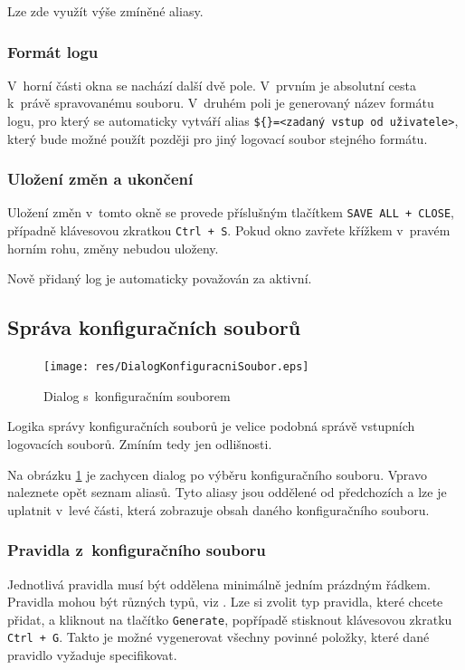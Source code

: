 \documentclass[a4paper,12pt]{article}
\begin{document}
Lze zde využít výše zmíněné aliasy.

\subsubsection{Formát logu}
V~horní části okna se nachází další dvě pole. V~prvním je absolutní cesta k~právě spravovanému souboru. V~druhém poli je generovaný název formátu logu, pro který se automaticky vytváří alias \texttt{\$\{<název formátu>\}=<zadaný vstup od uživatele>}, který bude možné použít později pro jiný logovací soubor stejného formátu.

\subsubsection{Uložení změn a ukončení}
Uložení změn v~tomto okně se provede příslušným tlačítkem \texttt{SAVE ALL + CLOSE}, případně klávesovou zkratkou \texttt{Ctrl + S}. Pokud okno zavřete křížkem v~pravém horním rohu, změny nebudou uloženy.

Nově přidaný log je automaticky považován za aktivní.

\subsection{Správa konfiguračních souborů}
\begin{figure}[h]
  \centering
  \texttt{[image: res/DialogKonfiguracniSoubor.eps]}
  \caption{Dialog s~konfiguračním souborem}
  \label{fig:DialogKonfiguracniSoubor}
\end{figure}

Logika správy konfiguračních souborů je velice podobná správě vstupních logovacích souborů. Zmíním tedy jen odlišnosti.

Na obrázku \ref{fig:DialogKonfiguracniSoubor} je zachycen dialog po výběru konfiguračního souboru.
Vpravo naleznete opět seznam aliasů. Tyto aliasy jsou oddělené od předchozích a lze je uplatnit v~levé části, která zobrazuje obsah daného konfiguračního souboru.

\subsubsection{Pravidla z~konfiguračního souboru}
Jednotlivá pravidla musí být oddělena minimálně jedním prázdným řádkem. Pravidla mohou být různých typů, viz \cite{secManPage}. Lze si zvolit typ pravidla, které chcete přidat, a kliknout na tlačítko \texttt{Generate}, popřípadě stisknout klávesovou zkratku \texttt{Ctrl + G}. Takto je možné vygenerovat všechny povinné položky, které dané pravidlo vyžaduje specifikovat. 
\end{document}
